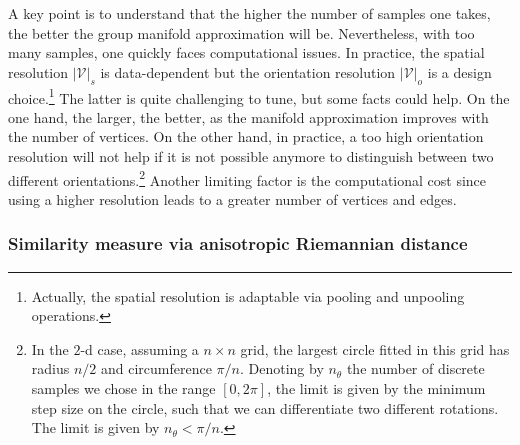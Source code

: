 \documentclass{article}
\begin{document}
A key point is to understand that the higher the number of samples one takes, the better the group manifold approximation will be. Nevertheless, with too many samples, one quickly faces computational issues. In practice, the spatial resolution $|\mathcal{V}|_s$ is data-dependent but the orientation resolution $|\mathcal{V}|_o$ is a design choice.\footnote{Actually, the spatial resolution is adaptable via pooling and unpooling operations.} The latter is quite challenging to tune, but some facts could help. On the one hand, the larger, the better, as the manifold approximation improves with the number of vertices. On the other hand, in practice, a too high orientation resolution will not help if it is not possible anymore to distinguish between two different orientations.\footnote{In the $2$-d case, assuming a $n \times n$ grid, the largest circle fitted in this grid has radius $n/2$ and circumference $\pi/n$. Denoting by $n_\theta$ the number of discrete samples we chose in the range $[0, 2\pi]$, the limit is given by the minimum step size on the circle, such that we can differentiate two different rotations. The limit is given by $n_\theta < \pi / n$.} Another limiting factor is the computational cost since using a higher resolution leads to a greater number of vertices and edges.

\subsubsection{Similarity measure via anisotropic Riemannian distance}
\end{document}
